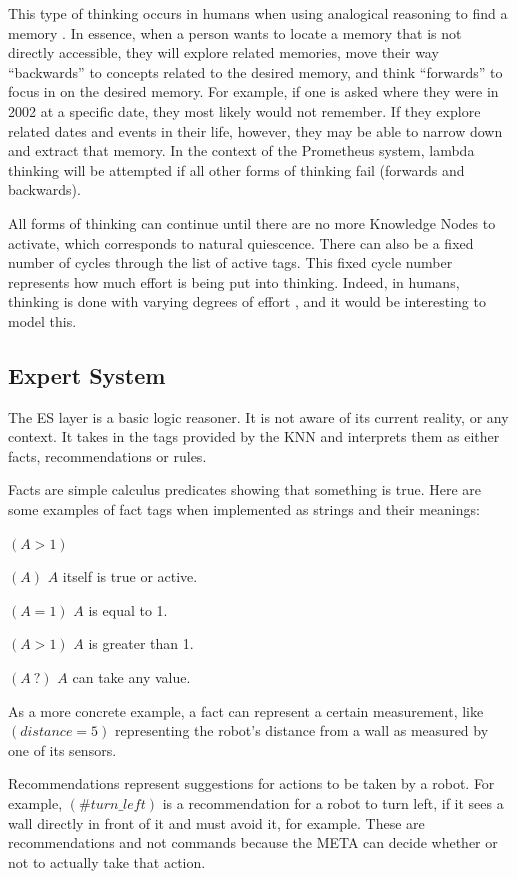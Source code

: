 \documentclass[titlepage,11pt]{article}
\begin{document}
This type of thinking occurs in humans when using analogical reasoning to find a memory \cite{vybihal-lambda}. In essence, when a person wants to locate a memory that is not directly accessible, they will explore related memories, move their way ``backwards'' to concepts related to the desired memory, and think ``forwards'' to focus in on the desired memory. For example, if one is asked where they were in 2002 at a specific date, they most likely would not remember. If they explore related dates and events in their life, however, they may be able to narrow down and extract that memory. In the context of the Prometheus system, lambda thinking will be attempted if all other forms of thinking fail (forwards and backwards).

All forms of thinking can continue until there are no more Knowledge Nodes to activate, which corresponds to natural quiescence. There can also be a fixed number of cycles through the list of active tags. This fixed cycle number represents how much effort is being put into thinking. Indeed, in humans, thinking is done with varying degrees of effort \cite{thinking}, and it would be interesting to model this.

\subsection{Expert System}

The ES layer is a basic logic reasoner. It is not aware of its current reality, or any context. It takes in the tags provided by the KNN and interprets them as either facts, recommendations or rules.

Facts are simple calculus predicates showing that something is true. Here are some examples of fact tags when implemented as strings and their meanings:

\begin{labeling}{$(A > 1)$}
	\item[$(A)$] $A$ itself is true or active.
	\item[$(A = 1)$] $A$ is equal to 1.
	\item[$(A > 1)$] $A$ is greater than 1.
	\item[$(A \ ?)$] $A$ can take any value.
\end{labeling}

As a more concrete example, a fact can represent a certain measurement, like $(distance = 5)$ representing the robot's distance from a wall as measured by one of its sensors.

Recommendations represent suggestions for actions to be taken by a robot. For example, $(\#turn\_left)$ is a recommendation for a robot to turn left, if it sees a wall directly in front of it and must avoid it, for example. These are recommendations and not commands because the META can decide whether or not to actually take that action.
\end{document}
